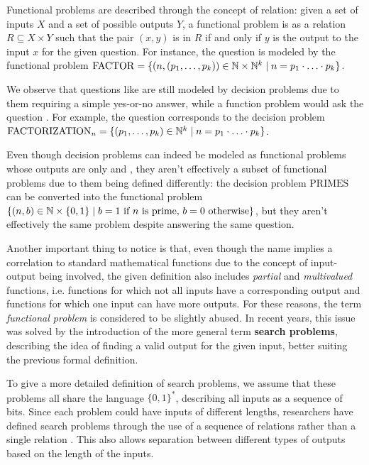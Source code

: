\newpage

Functional problems are described through the concept of relation: given a set of inputs $X$ and a set of possible outputs $Y$, a functional problem is as a relation $R \subseteq X \times Y$ such that the pair $(x,y)$ is in $R$ if and only if $y$ is the output to the input $x$ for the given question. For instance, the question  is modeled by the functional problem $\mathrm{FACTOR} = \{(n, (p_1, \ldots, p_k)) \in \mathbb{N} \times \mathbb{N}^k \mid n = p_1 \cdot \ldots \cdot p_k\}$.

We observe that questions like  are still modeled by decision problems due to them requiring a simple yes-or-no answer, while a function problem would ask the question . For example, the question  corresponds to the decision problem $\mathrm{FACTORIZATION}_n = \{(p_1, \ldots, p_k) \in \mathbb{N}^k \mid n = p_1 \cdot \ldots \cdot p_k\}$.

Even though decision problems can indeed be modeled as functional problems whose outputs are only  and , they aren't effectively a subset of functional problems due to them being defined differently: the decision problem $\mathrm{PRIMES}$ can be converted into the functional problem $\{(n, b) \in \mathbb{N} \times \{0,1\} \mid b = 1 \text{ if } n \text{ is prime, } b = 0 \text{ otherwise}\}$, but they aren't effectively the same problem despite answering the same question.

Another important thing to notice is that, even though the name implies a correlation to standard mathematical functions due to the concept of input-output being involved, the given definition also includes \textit{partial} and \textit{multivalued} functions, i.e. functions for which not all inputs have a corresponding output and functions for which one input can have more outputs. For these reasons, the term \textit{functional problem} is considered to be slightly abused. In recent years, this issue was solved by the introduction of the more general term \textbf{search problems}, describing the idea of finding a valid output for the given input, better suiting the previous formal definition.

To give a more detailed definition of search problems, we assume that these problems all share the language $\{0,1\}^*$, describing all inputs as a sequence of bits. Since each problem could have inputs of different lengths, researchers have defined search problems through the use of a sequence of relations rather than a single relation \cite{rel_comp_np_search, proofs_circuits_communication, tfnp_characterization}. This also allows separation between different types of outputs based on the length of the inputs.

